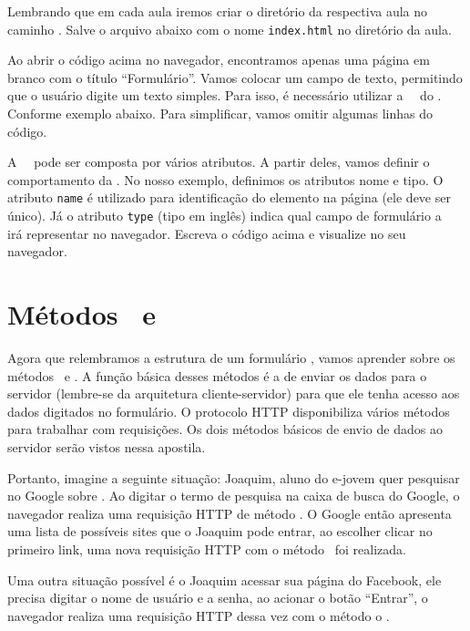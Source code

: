 

Lembrando que em cada aula iremos criar o diretório da respectiva aula no caminho
. Salve o arquivo abaixo com o nome \texttt{index.html} no
diretório da aula.



Ao abrir o código acima no navegador, encontramos apenas uma página em branco com o 
título ``Formulário''. Vamos colocar um campo de texto, permitindo que o usuário digite 
um texto simples. Para isso, é necessário utilizar a \tag~\taginput~do \html. Conforme 
exemplo abaixo. Para simplificar, vamos omitir algumas linhas do código.



A \tag~\taginput~pode ser composta por vários atributos. A partir deles, vamos definir o 
comportamento da \tag. No nosso exemplo, definimos os atributos nome e tipo. O atributo
\texttt{name} é utilizado para identificação do elemento na página (ele deve ser único). 
Já o atributo \texttt{type} (tipo em inglês) indica qual campo de formulário a \tag~\taginput~
irá representar no navegador. Escreva o código acima e visualize no seu navegador.

\section{Métodos \metodoGET~e \metodoPOST}
Agora que relembramos a estrutura de um formulário \html, vamos aprender sobre os métodos
\metodoGET~e \metodoPOST. A função básica desses métodos é a de enviar os dados para 
o servidor (lembre-se da arquitetura cliente-servidor) para que ele tenha acesso aos 
dados digitados no formulário. O protocolo HTTP disponibiliza vários métodos para 
trabalhar com requisições. Os dois métodos básicos de envio de dados ao servidor serão 
vistos nessa apostila.

Portanto, imagine a seguinte situação: Joaquim, aluno do e-jovem quer pesquisar no Google 
sobre \php. Ao digitar o termo de pesquisa na caixa de busca do Google, o navegador realiza 
uma requisição HTTP de método \metodoGET. O Google então apresenta uma lista de possíveis 
sites que o Joaquim pode entrar, ao escolher clicar no primeiro link, uma nova requisição 
HTTP com o método \metodoGET~foi realizada.

Uma outra situação possível é o Joaquim acessar sua página do Facebook, ele precisa digitar 
o nome de usuário e a senha, ao acionar o botão “Entrar”, o navegador realiza uma requisição 
HTTP dessa vez com o método o \metodoPOST.

